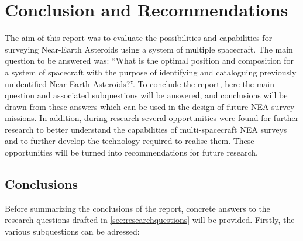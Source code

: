 \chapter{Conclusion and Recommendations}
\label{ch:conclusion}
The aim of this report was to evaluate the possibilities and capabilities for surveying Near-Earth Asteroids using a system of multiple spacecraft. The main question to be answered was: ``What is the optimal position and composition for a system of spacecraft with the purpose of identifying and cataloguing previously unidentified Near-Earth Asteroids?''. To conclude the report, here the main question and associated subquestions will be answered, and conclusions will be drawn from these answers which can be used in the design of future NEA survey missions. In addition, during research several opportunities were found for further research to better understand the capabilities of multi-spacecraft NEA surveys and to further develop the technology required to realise them. These opportunities will be turned into recommendations for future research.

\section{Conclusions}
Before summarizing the conclusions of the report, concrete answers to the research questions drafted in \autoref{sec:researchquestions} will be provided. Firstly, the various subquestions can be adressed:

